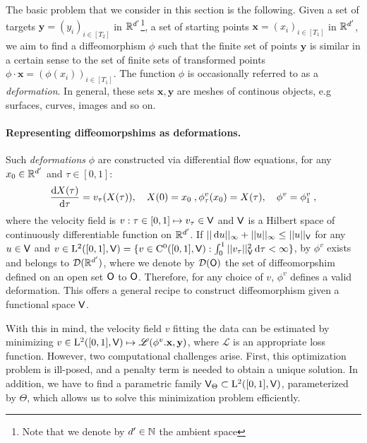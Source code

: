 The basic problem that we consider in this section is the following. Given a set of targets $\mathbf{y}=(y_i)_{i\in[T_2]}$ in $\mathbb{R}^{d'}$\footnote{Note that we denote by $d'\in\mathbb{N}$ the ambient space}, a set of starting points $\mathbf{x}=(x_{i})_{i\in[T_1]}$ in $\mathbb{R}^{d'}$, we aim to find a diffeomorphism $\phi$ such that the finite set of points $\mathbf{y}$ is similar in a certain sense to the set of finite sets of transformed points $\phi \cdot \mathbf{x} =(\phi(x_i))_{i\in[T_1]} $.
 The function $\phi$ is occasionally referred to as a \textit{deformation}. In general, these sets $\mathbf{x},\mathbf{y}$ are meshes of continous objects, e.g surfaces, curves, images and so on.

 
\paragraph{Representing diffeomorpshims as deformations.}
Such \textit{deformations} $\phi$ are constructed via differential flow equations, for any $x_0\in \mathbb{R}^{d'} $ and $\tau\in[0,1]$:
\begin{equation}
  \label{eq:LDDMM_dynamic}
    \frac{\mathop{}\!\mathrm{d} X(\tau)}{\mathop{}\!\mathrm{d} \tau}= v_\tau(X(\tau)), \quad X(0)=x_0\; ,
    \phi^v_\tau(x_0)=X(\tau), \quad \phi^v=\phi^v_1  \; ,
\end{equation}
where the velocity field is $v:\tau\in [0,1]\mapsto v_\tau\in \mathsf{V} $
and $\mathsf{V}$ is a Hilbert space of continuously differentiable function
on $\mathbb{R}^{d'}$.  If
$||\mathop{}\!\mathrm{d} u ||_{\infty}+|| u ||_{\infty}\leq ||u ||_{\mathsf{V}} $ for any
$u\in \mathsf{V}$ and
$v\in \mathrm{L}^2([0,1],\mathsf{V})=\{v\in \mathrm{C}^0([0,1],\mathsf{V}): \int_0^1 ||
v_\tau||^2_{\mathsf{V}} \mathop{}\!\mathrm{d} \tau<\infty \} $, by \citep[Theorem 5]{glaunes2005transport}
$\phi^v$ exists and belongs to $\mathcal{D}(\mathbb{R}^{d'})$, where we denote by $\mathcal{D}(\mathsf{O}) $ the set of diffeomorpshim defined on an open set $\mathsf{O}$ to $\mathsf{O}$.
 Therefore, for any choice of $v$, $\phi^v$ defines a valid deformation. 
This offers a general recipe to construct diffeomorphism given a functional space $\mathsf{V}$.

With this in mind, the velocity field $v$ fitting the data can be
estimated by minimizing 
$v \in \mathrm{L}^2([0,1],\mathsf{V}) \mapsto \mathscr{L}(\phi^{v}.\mathbf{x},\mathbf{y})$, where $\mathscr{L}$ is an appropriate loss function.
 However, two computational challenges arise.
  First, this optimization problem is ill-posed, and a penalty term is needed to obtain a unique solution.
   In addition, we have to find a parametric family $\mathsf{V}_{\Theta} \subset \mathrm{L}^2([0,1],\mathsf{V})$, parameterized by $\Theta$, which allows us to solve this minimization problem efficiently. 

